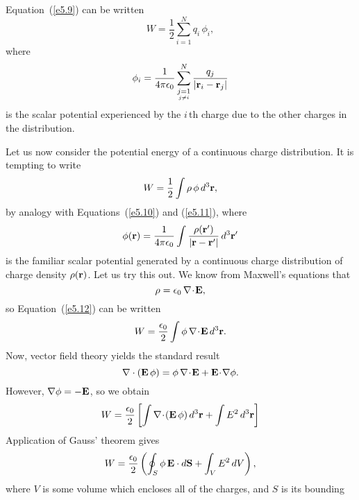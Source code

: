 Equation~(\ref{e5.9}) can be written
\begin{equation}\label{e5.10}
W = \frac{1}{2} \sum_{i=1}^N q_i \,\phi_i,
\end{equation}
where
\begin{equation}\label{e5.11}
\phi_i = \frac{1}{4\pi\epsilon_0}\sum_{
\stackrel{\scriptstyle j=1} {\scriptscriptstyle j\neq i}}^N
\frac{q_j}{|{\bf r}_i - {\bf r}_j|}
\end{equation}
is the scalar potential experienced  by the $i$\,th charge due to the other
charges in the distribution.

Let us now consider the potential energy of a continuous charge distribution.
It is tempting to write
\begin{equation}\label{e5.12}
W = \frac{1}{2} \int \rho\,\phi\,d^3{\bf r},
\end{equation}
by analogy with Equations~(\ref{e5.10}) and (\ref{e5.11}), where 
\begin{equation}\label{e5.13}
\phi({\bf r}) = \frac{1}{4\pi\epsilon_0}\int \frac{\rho({\bf r}')}
{|{\bf r} - {\bf r}'|}\,d^3{\bf r}'
\end{equation}
is the familiar scalar potential generated by a continuous charge distribution
of charge density $\rho({\bf r})$.
Let us try this out. We know from Maxwell's equations that
\begin{equation}
\rho = \epsilon_0 \,\nabla\!\cdot \!{\bf E},
\end{equation}
so Equation~(\ref{e5.12}) can be written
\begin{equation}
W =\frac{\epsilon_0}{2}\int\phi\,  \nabla\!\cdot\! {\bf E} \,d^3{\bf r}.
\end{equation}
Now, vector field theory yields the standard result
\begin{equation}
\nabla \cdot({\bf E} \,\phi) = \phi\,\nabla\!\cdot\!{\bf E} +{\bf E}\! \cdot\!
 \nabla\phi.
\end{equation}
However, $\nabla\phi = - {\bf E}$, so we obtain
\begin{equation}
W = \frac{\epsilon_0}{2} \left[\int \nabla\!\cdot \!({\bf E}\,\phi)\,d^3{\bf r}
+
\int E^2\,d^3 {\bf r}\right]
\end{equation}
Application of Gauss' theorem gives
\begin{equation}\label{e5.18}
W = \frac{\epsilon_0}{2} \left(\oint_S \phi\,{\bf E} \cdot d{\bf S}+
\int_V E^2\,dV\right),
\end{equation}
where $V$ is some volume which encloses all of the charges, and $S$ is its bounding
